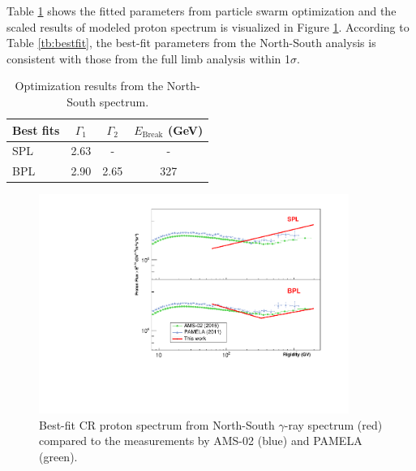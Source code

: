 Table \ref{tb:bestfit_ns} shows the fitted parameters from
particle swarm optimization and the scaled results of modeled
proton spectrum is visualized in Figure \ref{fig:ns_vsother}.
According to Table \ref{tb:bestfit}, the
best-fit parameters from the North-South analysis is consistent with
those from the full limb analysis within 1$\sigma$.

\begin{table}[h!]
    \centering
    \begin{tabular}{l | c | c | c}
      Best fits & $\Gamma_1$ & $\Gamma_2$ & $E_{\text{Break}}$ (GeV) \\
      \hline \hline
      SPL & 2.63 & - & -  \\
      BPL & 2.90  & 2.65 & 327
    \end{tabular}
    \caption{Optimization results from the North-South spectrum.}
    \label{tb:bestfit_ns}
\end{table}

\begin{figure}[h]
    \centering
    \includegraphics[width=0.9\textwidth]{appendix/ns_analysis/figures/vsother.pdf}
    \caption{
        Best-fit CR proton spectrum from 
        North-South $\gamma$-ray spectrum (red)
        compared to the measurements by
        AMS-02 (blue) and PAMELA (green).
    }
    \label{fig:ns_vsother}
\end{figure}

